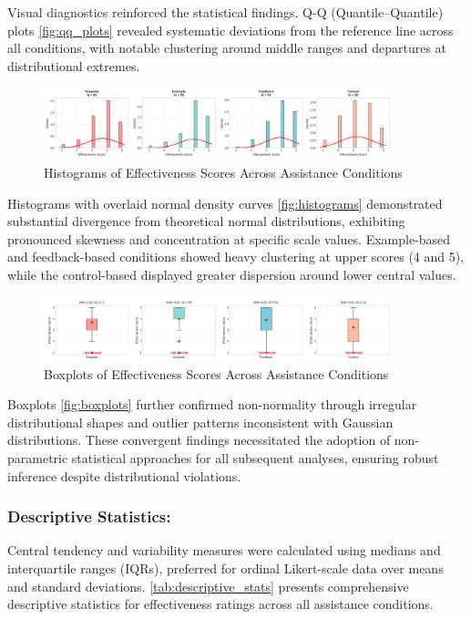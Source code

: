 Visual diagnostics reinforced the statistical findings. Q-Q (Quantile–Quantile) plots \autoref{fig:qq_plots} revealed systematic deviations from the reference line across all conditions, with notable clustering around middle ranges and departures at distributional extremes.  

\begin{figure}[h]
\centering
\includegraphics[width=0.9\textwidth]{figures/02.png}
\caption{Histograms of Effectiveness Scores Across Assistance Conditions}
\label{fig:histograms}
\end{figure}

Histograms with overlaid normal density curves \autoref{fig:histograms} demonstrated substantial divergence from theoretical normal distributions, exhibiting pronounced skewness and concentration at specific scale values. Example-based and feedback-based conditions showed heavy clustering at upper scores (4 and 5), while the control-based displayed greater dispersion around lower central values.

\begin{figure}[h]
\centering
\includegraphics[width=0.9\textwidth]{figures/03.png}
\caption{Boxplots of Effectiveness Scores Across Assistance Conditions}
\label{fig:boxplots}
\end{figure}

Boxplots \autoref{fig:boxplots} further confirmed non-normality through irregular distributional shapes and outlier patterns inconsistent with Gaussian distributions. These convergent findings necessitated the adoption of non-parametric statistical approaches for all subsequent analyses, ensuring robust inference despite distributional violations.

\subsubsection{Descriptive Statistics:}

Central tendency and variability measures were calculated using medians and interquartile ranges (IQRs), preferred for ordinal Likert-scale data over means and standard deviations. \autoref{tab:descriptive_stats} presents comprehensive descriptive statistics for effectiveness ratings across all assistance conditions.

